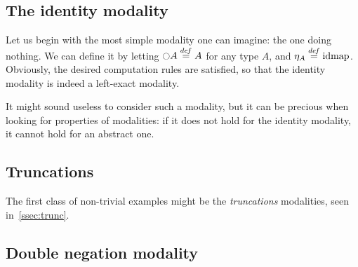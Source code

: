\subsection{The identity modality}
\label{ssec:id_mod}

Let us begin with the most simple modality one can imagine: the one
doing nothing. We can define it by letting $\ocircle A \overset{de\hspace{-0.2ex}f}{=} A$ for any type
$A$, and $\eta_A \overset{de\hspace{-0.2ex}f}{=} \operatorname{\mathrm{idmap}}$. Obviously, the desired computation
rules are satisfied, so that the identity modality is indeed a
left-exact modality.

It might sound useless to consider such a modality, but it can be
precious when looking for properties of modalities: if it does not
hold for the identity modality, it cannot hold for an abstract one.


\subsection{Truncations}
\label{ssec:truncations}

The first class of non-trivial examples might be the {\em truncations}
modalities, seen in~\ref{ssec:trunc}.

\subsection{Double negation modality}
\label{ssec:notnot}

